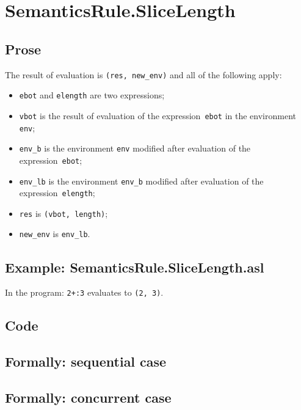 \documentclass{book}
\begin{document}

\section{SemanticsRule.SliceLength \label{sec:SemanticsRule.SliceLength}}

  \subsection{Prose}
  The result of evaluation is \texttt{(res, new\_env)} and all of the following
apply:
  \begin{itemize}
  \item \texttt{ebot} and \texttt{elength} are two expressions;
  \item \texttt{vbot} is the result of evaluation of the expression~\texttt{ebot} in the environment \texttt{env}; 
  \item \texttt{env\_b} is the environment \texttt{env} modified after evaluation of the expression~\texttt{ebot}; 
  \item \texttt{env\_lb} is the environment \texttt{env\_b} modified after evaluation of the expression~\texttt{elength};
  \item \texttt{res} is \texttt{(vbot, length)};
  \item \texttt{new\_env} is \texttt{env\_lb}.
  \end{itemize}

  \subsection{Example: SemanticsRule.SliceLength.asl}
  In the program:
  \texttt{2+:3} evaluates to \texttt{(2, 3)}.

  \subsection{Code}

\begin{emptyformal}
  \subsection{Formally: sequential case}

  \subsection{Formally: concurrent case}
\end{emptyformal}
\end{document}
